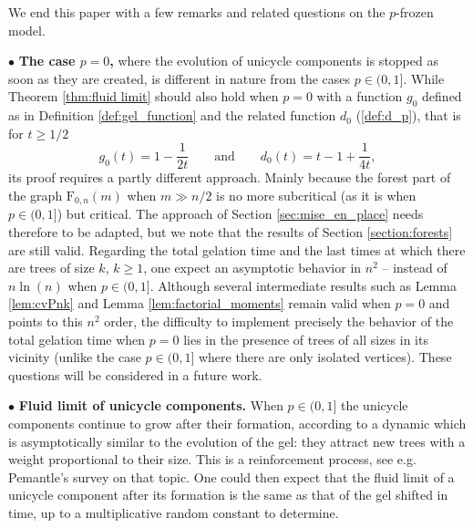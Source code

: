 \documentclass[a4, 11pt]{article}
\numberwithin{equation}{section}
\theoremstyle{plain}
\theoremstyle{definition}
\theoremstyle{remark}
\begin{document}
We end this paper with a few remarks and related questions on the $p$-frozen model.

$\bullet$ \textbf{The case $p=0$,} where the evolution of unicycle components is stopped as soon as they are created, is different in nature from the cases $p\in (0,1]$. While Theorem \ref{thm:fluid limit} should also hold when $p=0$ with a function $g_0$ defined as in Definition \ref{def:gel_function} and the related function $d_0$ (\ref{def:d_p}), that is for $t\geq 1/2$
\begin{equation*}
	g_0(t)=1-\frac{1}{2t} \qquad \text{and} \qquad d_0(t)=t-1+\frac{1}{4t},
\end{equation*}
its proof requires a partly different approach. Mainly because the forest part of the graph $\mathrm F_{0,n}(m)$ when $m \gg n/2$ is no more subcritical (as it is when $p \in (0,1]$) but critical. The approach of Section \ref{sec:mise_en_place} needs therefore to be adapted, but we note that the results of Section \ref{section:forests} are still valid. Regarding the total gelation time and the last times at which there are trees of size $k$, $k\geq1$, one expect an asymptotic behavior in $n^2$ -- instead of $n\ln(n)$ when $p \in (0,1]$. Although several intermediate results such as Lemma \ref{lem:cvPnk} and Lemma \ref{lem:factorial_moments} remain valid when $p=0$ and points to this $n^2$ order, the difficulty to implement precisely the behavior of the total gelation time when $p=0$ lies in the presence of trees of all sizes in its vicinity (unlike the case  $p \in (0,1]$ where there are only isolated vertices). These questions will be considered in a future work. 


$\bullet$ \textbf{Fluid limit of unicycle components.} When $p \in (0,1]$ the unicycle components continue to grow after their formation, according to a dynamic which is asymptotically similar to the evolution of the gel: they attract new trees with a weight proportional to their size. This is a reinforcement process, see e.g. Pemantle's survey \cite{Pemantle07} on that topic. One could then expect that the fluid limit of a unicycle component after its formation is the same as that of the gel shifted in time, up to a multiplicative random constant to determine.    
\end{document}
